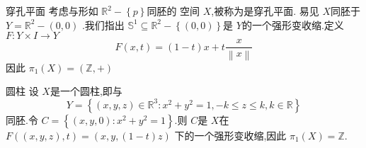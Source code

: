\documentclass[../../几何与拓扑.tex]{subfiles}
\begin{document}
\begin{example}{穿孔平面}
    考虑与形如 \(  \mathbb{R} ^{2}-\left\{ p \right\}  \)同胚的 空间 \(  X  \),被称为是穿孔平面.
    易见 \(  X  \)同胚于 \(  Y =  \mathbb{R} ^{2}- \left( 0,0 \right)   \)    .我们指出 \(  \mathbb{S}^{1}\subseteq \mathbb{R} ^{2}- \left\{ \left( 0,0 \right)  \right\}  \)是 \(  Y  \)的一个强形变收缩.定义 \(  F: Y \times I \to Y  \) \[
    F\left( x,t \right) =  \left( 1-t \right)x +  t   \frac{x  }{\left\| x \right\| }   
    \]   因此 \(  \pi _1 \left( X \right) =  \left( \mathbb{Z} ,+  \right)    \) 
\end{example}

\hspace*{\fill} 

\begin{example}{圆柱}
    设 \(  X  \)是一个圆柱,即与 \[
    Y =  \left\{ \left( x,y,z \right) \in \mathbb{R} ^{3}: x^{2}+ y^{2}= 1, -k\le z\le k,k \in \mathbb{R}   \right\}
    \]同胚.令 \(  C =  \left\{ \left( x,y,0 \right): x^{2}+ y^{2}= 1  \right\}  \).则 \(  C  \)是 \(  X  \)在 \(  F\left( \left( x,y,z \right),t  \right)= \left( x,y,\left( 1-t \right)z  \right)    \)     下的一个强形变收缩,因此 \(  \pi _1 \left( X \right)= \mathbb{Z}    \). 
\end{example}

\hspace*{\fill} 
\end{document}
